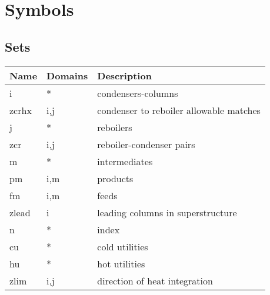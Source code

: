 \documentclass[11pt]{article}
\begin{document}
\section*{Symbols}


\subsection*{Sets}
\begin{tabularx}{\textwidth}{| l | l | X |}
\hline
\textbf{Name} & \textbf{Domains} & \textbf{Description}\\
\hline
\endhead

i & * & condensers-columns\\
zcrhx & i,j & condenser to reboiler allowable matches\\
j & * & reboilers\\
zcr & i,j & reboiler-condenser pairs\\
m & * & intermediates\\
pm & i,m & products\\
fm & i,m & feeds\\
zlead & i & leading columns in superstructure\\
n & * & index\\
cu & * & cold utilities\\
hu & * & hot utilities\\
zlim & i,j & direction of heat integration\\
\hline
\end{tabularx}
\end{document}
